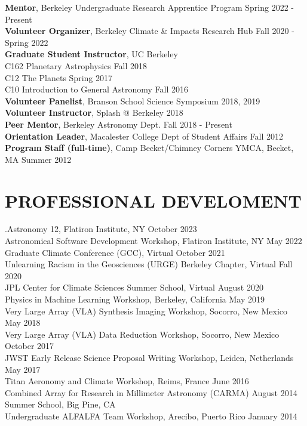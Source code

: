 \documentclass[margin, 10pt]{res} %
\newcommand\tab[1][1cm]{\hspace*{#1}}
\begin{document}
\begin{resume}
{\bf Mentor}, Berkeley Undergraduate Research Apprentice Program \hfill Spring 2022 - Present \\
{\bf Volunteer Organizer}, Berkeley Climate \& Impacts Research Hub \hfill Fall 2020 - Spring 2022 \\
{\bf Graduate Student Instructor}, UC Berkeley \\
\tab C162 Planetary Astrophysics \hfill Fall 2018 \\
\tab C12 The Planets \hfill  Spring 2017 \\
\tab C10 Introduction to General Astronomy \hfill Fall 2016 \\
{\bf Volunteer Panelist}, Branson School Science Symposium \hfill 2018, 2019 \\
{\bf Volunteer Instructor}, Splash @ Berkeley \hfill 2018 \\
{\bf Peer Mentor}, Berkeley Astronomy Dept.
\hfill Fall 2018 - Present \\
{\bf Orientation Leader}, Macalester College Dept of Student Affairs
\hfill Fall 2012 \\
{\bf Program Staff (full-time)}, Camp Becket/Chimney Corners YMCA,
Becket, MA
\hfill Summer 2012



\section{PROFESSIONAL DEVELOMENT}

.Astronomy 12, Flatiron Institute, NY \hfill October 2023 \\
Astronomical Software Development Workshop, Flatiron Institute, NY \hfill May 2022 \\ 
Graduate Climate Conference (GCC), Virtual \hfill October 2021 \\ 
Unlearning Racism in the Geosciences (URGE) Berkeley Chapter, Virtual \hfill Fall 2020 \\ 
JPL Center for Climate Sciences Summer School, Virtual \hfill August 2020 \\ 
Physics in Machine Learning Workshop, Berkeley, California \hfill May 2019 \\
Very Large Array (VLA) Synthesis Imaging Workshop, Socorro, New Mexico \hfill May 2018 \\
Very Large Array (VLA) Data Reduction Workshop, Socorro, New Mexico \hfill October 2017 \\
JWST Early Release Science Proposal Writing Workshop, Leiden, Netherlands \hfill May 2017 \\
Titan Aeronomy and Climate Workshop, Reims, France \hfill June 2016 \\
Combined Array for Research in Millimeter Astronomy (CARMA) \hfill August 2014 \\
  \tab Summer School, Big Pine, CA  \\
Undergraduate ALFALFA Team Workshop, Arecibo, Puerto Rico \hfill January 2014


\end{resume}
\end{document}
